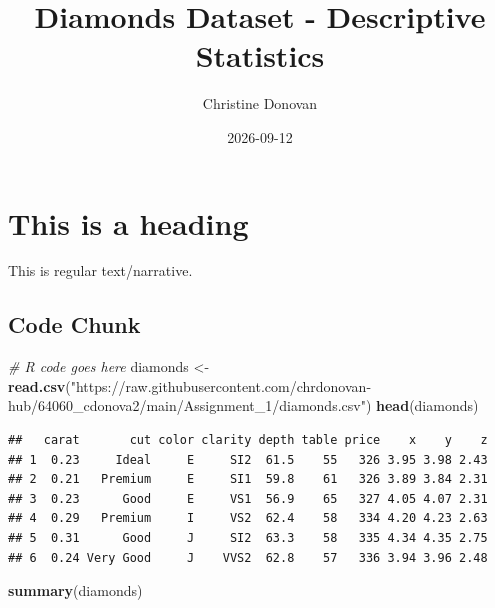 \documentclass[
]{article}
\title{Diamonds Dataset - Descriptive Statistics}
\author{Christine Donovan}
\date{2026-09-12}
\newenvironment{Shaded}{\begin{snugshade}}{\end{snugshade}}
\newcommand{\CommentTok}[1]{\textcolor[rgb]{0.56,0.35,0.01}{\textit{#1}}}
\newcommand{\FunctionTok}[1]{\textcolor[rgb]{0.13,0.29,0.53}{\textbf{#1}}}
\newcommand{\NormalTok}[1]{#1}
\newcommand{\OtherTok}[1]{\textcolor[rgb]{0.56,0.35,0.01}{#1}}
\newcommand{\StringTok}[1]{\textcolor[rgb]{0.31,0.60,0.02}{#1}}
\begin{document}
\maketitle

\section{This is a heading}\label{this-is-a-heading}

This is regular text/narrative.

\subsection{Code Chunk}\label{code-chunk}

\begin{Shaded}
\begin{Highlighting}[]
\CommentTok{\# R code goes here}
\NormalTok{diamonds }\OtherTok{\textless{}{-}} \FunctionTok{read.csv}\NormalTok{(}\StringTok{"https://raw.githubusercontent.com/chrdonovan{-}hub/64060\_cdonova2/main/Assignment\_1/diamonds.csv"}\NormalTok{)}
\FunctionTok{head}\NormalTok{(diamonds)}
\end{Highlighting}
\end{Shaded}

\begin{verbatim}
##   carat       cut color clarity depth table price    x    y    z
## 1  0.23     Ideal     E     SI2  61.5    55   326 3.95 3.98 2.43
## 2  0.21   Premium     E     SI1  59.8    61   326 3.89 3.84 2.31
## 3  0.23      Good     E     VS1  56.9    65   327 4.05 4.07 2.31
## 4  0.29   Premium     I     VS2  62.4    58   334 4.20 4.23 2.63
## 5  0.31      Good     J     SI2  63.3    58   335 4.34 4.35 2.75
## 6  0.24 Very Good     J    VVS2  62.8    57   336 3.94 3.96 2.48
\end{verbatim}

\begin{Shaded}
\begin{Highlighting}[]
\FunctionTok{summary}\NormalTok{(diamonds)}
\end{Highlighting}
\end{Shaded}
\end{document}
